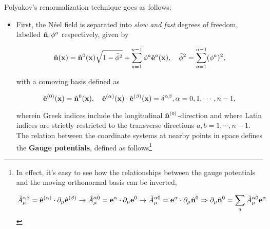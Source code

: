 Polyakov's renormalization technique goes as follows:

\begin{itemize}
    \item First, the Néel field is separated into \textit{slow \textnormal{and} fast} degrees of freedom, labelled ${\hat{{\bf n}}}, \phi^a$ respectively, given by 
    
    \begin{equation}
        \hat{{\bf n}}({\bf x}) = \hat{{\bf n}}^{0}({\bf x})
                                    \sqrt{1-\bar{\phi}^2} + \sum_{a=1}^{n-1} \phi^a \hat{{\bf e}}^{a}({\bf x}), \quad \bar{\phi}^2 = \sum_{a=1}^{n-1} (\phi^a)^2,
                                    \label{NLSM_Polyakov_fast_slow_fields}
    \end{equation}
    
    with a comoving basis defined as 
    
    \begin{equation}
        \hat{{\bf e}}^{(0)}({\bf x}) = \hat{{\bf n}}^{0}({\bf x}), \quad \hat{{\bf e}}^{(\alpha)}({\bf x}) \cdot \hat{{\bf e}}^{(\beta)}({\bf x}) = \delta^{\alpha \beta}, \alpha = 0,1,\cdots, n-1,
    \end{equation}
    
    wherein Greek indices include the longitudinal $\hat{{\bf n}}^{(0)}$-direction and where Latin indices are strictly restricted to the transverse directions $a,b = 1, \cdots, n-1$. 
    The relation between the coordinate systems at nearby points in space defines the \textbf{Gauge potentials}, defined as follows\footnote{
    
    In effect, it's easy to see how the relationships between the gauge potentials and the moving orthonormal basis can be inverted, 
    
\begin{equation}
    \begin{split}
        \tilde{A}^{\alpha \beta}_{\mu} = \hat{{\bf e}}^{(\alpha)} \cdot \partial_{\mu} \hat{{\bf e}}^{(\beta)} 
        \rightarrow 
        \tilde{A}^{\alpha 0}_{\mu} = {\bf e}^{\alpha} \cdot \partial_{\mu} {\bf e}^{0} 
        \rightarrow \tilde{A}^{\alpha 0}_{\mu} = {\bf e}^{\alpha} \cdot \partial_{\mu} \hat{{\bf n}}^{0} \Rightarrow \partial_{\mu} \hat{{\bf n}}^{0} = \sum_{a} \tilde{A}^{\alpha 0}_{\mu} {\bf e}^{\alpha}
    \end{split}
\end{equation}
    } 
    

\end{itemize}
